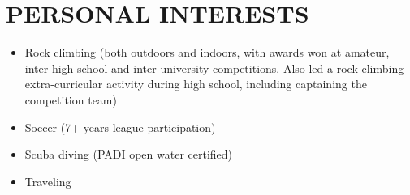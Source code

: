 \documentclass[a4paper,10pt]{extarticle}
\begin{document}
\section*{PERSONAL INTERESTS}
\begin{itemize}
    \item Rock climbing (both outdoors and indoors, with awards won at amateur, inter-high-school and inter-university competitions. Also led a rock climbing extra-curricular activity during high school, including captaining the competition team)

    \item Soccer (7+ years league participation)

    \item Scuba diving (PADI open water certified)

    \item Traveling
\end{itemize}







\end{document}
